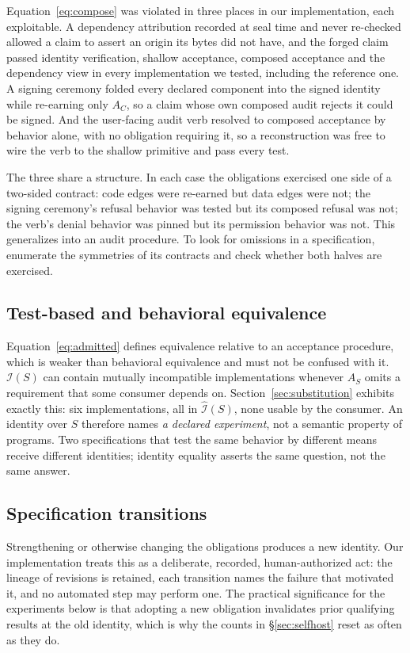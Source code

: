 \documentclass[10pt,twocolumn]{article}
\begin{document}
Equation~\eqref{eq:compose} was violated in three places in our
implementation, each exploitable. A dependency attribution recorded at
seal time and never re-checked allowed a claim to assert an origin its
bytes did not have, and the forged claim passed identity verification,
shallow acceptance, composed acceptance and the dependency view in every
implementation we tested, including the reference one. A signing
ceremony folded every declared component into the signed identity while
re-earning only $A_C$, so a claim whose own composed audit rejects it
could be signed. And the user-facing audit verb resolved to composed
acceptance by behavior alone, with no obligation requiring it, so a
reconstruction was free to wire the verb to the shallow primitive and
pass every test.

The three share a structure. In each case the obligations exercised one
side of a two-sided contract: code edges were re-earned but data edges
were not; the signing ceremony's refusal behavior was tested but its
composed refusal was not; the verb's denial behavior was pinned but its
permission behavior was not. This generalizes into an audit procedure.
To look for omissions in a specification, enumerate the symmetries of its
contracts and check whether both halves are exercised.

\subsection{Test-based and behavioral equivalence}

Equation~\eqref{eq:admitted} defines equivalence relative to an
acceptance procedure, which is weaker than behavioral equivalence and
must not be confused with it. $\mathcal{I}(S)$ can contain mutually
incompatible implementations whenever $A_S$ omits a requirement that
some consumer depends on. Section~\ref{sec:substitution} exhibits exactly
this: six implementations, all in $\widehat{\mathcal{I}}(S)$, none usable
by the consumer. An identity over $S$ therefore names \emph{a declared
experiment}, not a semantic property of programs. Two specifications that
test the same behavior by different means receive different identities;
identity equality asserts the same question, not the same answer.

\subsection{Specification transitions}

Strengthening or otherwise changing the obligations produces a new
identity. Our implementation treats this as a deliberate, recorded,
human-authorized act: the lineage of revisions is retained, each
transition names the failure that motivated it, and no automated step may
perform one. The practical significance for the experiments below is that
adopting a new obligation invalidates prior qualifying results at the old
identity, which is why the counts in \S\ref{sec:selfhost} reset as often
as they do.
\end{document}
